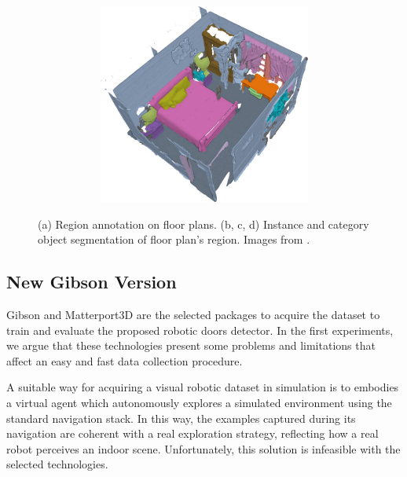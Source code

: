 \begin{figure}[h!]
\begin{subfigure}[b]{\linewidth}
\begin{subfigure}[b]{0.32\linewidth}
			\caption{}
			\label{fig:matterport_object_annotation_2}
		\end{subfigure}
		\hfil
		\begin{subfigure}[b]{0.32\linewidth}
			\centering
			\includegraphics[width=\textwidth]{images/matterport_room22_categories.pdf}
			\caption{}
			\label{fig:matterport_object_annotation_3}
		\end{subfigure}
	\end{subfigure}
	\caption{(a) Region annotation on floor plans. (b, c, d) Instance and category object segmentation of floor plan's region. Images from \cite{matterport}.}
\end{figure}

\subsection{New Gibson Version}
\label{sec:new_gibson_version}

Gibson and Matterport3D are the selected packages to acquire the dataset to train and evaluate the proposed robotic doors detector. In the first experiments, we argue that these technologies present some problems and limitations that affect an easy and fast data collection procedure. 

A suitable way for acquiring a visual robotic dataset in simulation is to embodies a virtual agent which autonomously explores a simulated environment using the standard navigation stack. In this way, the examples captured during its navigation are coherent with a real exploration strategy, reflecting how a real robot perceives an indoor scene. Unfortunately, this solution is infeasible with the selected technologies. 

